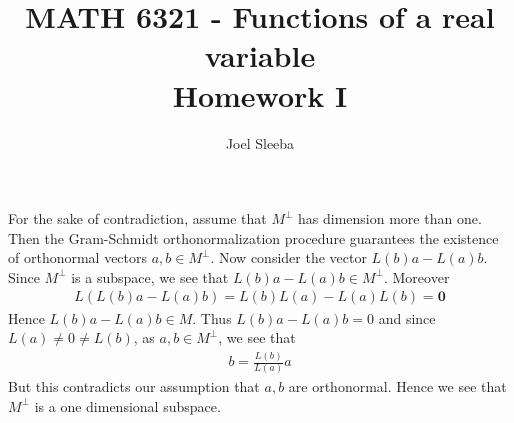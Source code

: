 \documentclass[12pt]{exam}
\theoremstyle{plain} %
\theoremstyle{definition} %
\theoremstyle{remark} %
\begin{document}
\title{MATH 6321 - Functions of a real variable \\ Homework  I}

\author{
  Joel Sleeba \\
}

\maketitle
\printanswers
\unframedsolutions

\begin{questions}
  \question
  \begin{solution}
    For the sake of contradiction, assume that $M^\perp$ has
    dimension more than one. Then the Gram-Schmidt orthonormalization
    procedure guarantees the existence of orthonormal vectors $a, b
    \in M^\perp$. Now consider the vector $L(b)a - L(a)b$. Since
    $M^\perp$ is a subspace, we see that $L(b)a - L(a)b \in M^\perp$. Moreover
    \begin{align*}
      L( L(b) a - L(a) b) = L(b)L(a) - L(a)L(b) = \textbf{0}
    \end{align*}
    Hence $L(b) a - L(a) b \in M$. Thus $L(b) a  - L(a) b = 0$ and
    since $L(a) \neq 0 \neq L(b)$, as $a, b \in M^\perp$, we see that
    \begin{align*}
      b = \frac{L(b)}{L(a)}a
    \end{align*}
    But this contradicts our assumption that $ a, b$ are orthonormal.
    Hence we see that $M^\perp$ is a one dimensional subspace.
  \end{solution}

  \question


\end{questions}
\end{document}
